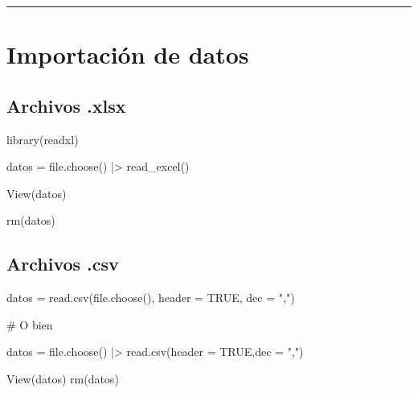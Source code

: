 \documentclass[
  spanish,
  letterpaper,
  DIV=11,
  numbers=noendperiod]{scrreprt}
\newenvironment{Shaded}{\begin{snugshade}}{\end{snugshade}}
\newcommand{\AttributeTok}[1]{\textcolor[rgb]{0.40,0.45,0.13}{#1}}
\newcommand{\CommentTok}[1]{\textcolor[rgb]{0.37,0.37,0.37}{#1}}
\newcommand{\ConstantTok}[1]{\textcolor[rgb]{0.56,0.35,0.01}{#1}}
\newcommand{\FunctionTok}[1]{\textcolor[rgb]{0.28,0.35,0.67}{#1}}
\newcommand{\NormalTok}[1]{\textcolor[rgb]{0.00,0.23,0.31}{#1}}
\newcommand{\OtherTok}[1]{\textcolor[rgb]{0.00,0.23,0.31}{#1}}
\newcommand{\SpecialCharTok}[1]{\textcolor[rgb]{0.37,0.37,0.37}{#1}}
\newcommand{\StringTok}[1]{\textcolor[rgb]{0.13,0.47,0.30}{#1}}
\begin{document}
\begin{center}\rule{0.5\linewidth}{0.5pt}\end{center}

\section{Importación de datos}\label{importaciuxf3n-de-datos}

\subsection{Archivos .xlsx}\label{archivos-.xlsx}

\begin{Shaded}
\begin{Highlighting}[]

\FunctionTok{library}\NormalTok{(readxl)}

\NormalTok{datos }\OtherTok{=} \FunctionTok{file.choose}\NormalTok{() }\SpecialCharTok{|\textgreater{}}
  \FunctionTok{read\_excel}\NormalTok{()}

\FunctionTok{View}\NormalTok{(datos)}

\FunctionTok{rm}\NormalTok{(datos)}
\end{Highlighting}
\end{Shaded}

\subsection{Archivos .csv}\label{archivos-.csv}

\begin{Shaded}
\begin{Highlighting}[]

\NormalTok{datos }\OtherTok{=} \FunctionTok{read.csv}\NormalTok{(}\FunctionTok{file.choose}\NormalTok{(), }\AttributeTok{header =} \ConstantTok{TRUE}\NormalTok{, }\AttributeTok{dec =} \StringTok{","}\NormalTok{)}

\CommentTok{\# O bien}

\NormalTok{datos }\OtherTok{=} \FunctionTok{file.choose}\NormalTok{() }\SpecialCharTok{|\textgreater{}}
  \FunctionTok{read.csv}\NormalTok{(}\AttributeTok{header =} \ConstantTok{TRUE}\NormalTok{,}\AttributeTok{dec =} \StringTok{","}\NormalTok{)}

\FunctionTok{View}\NormalTok{(datos)}
\FunctionTok{rm}\NormalTok{(datos)}
\end{Highlighting}
\end{Shaded}
\end{document}
